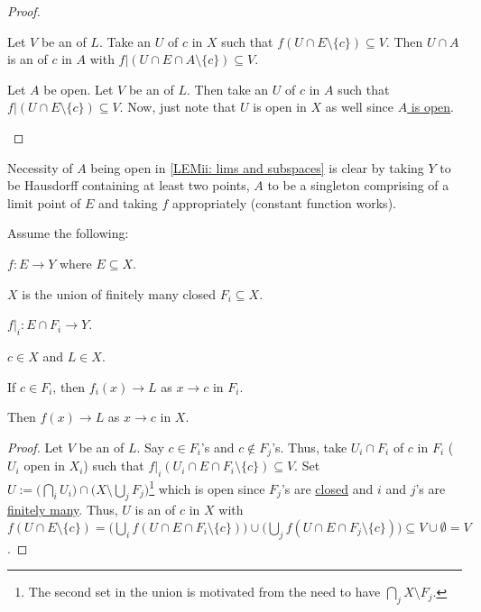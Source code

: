 	\begin{proof}
		\begin{mylist}
			\item Let $V$ be an \onbd of $L$. Take an \onbd $U$ of $c$ in $X$ such that $f(U\cap E\setminus\{c\})\subseteq V$. Then $U\cap A$ is an \onbd of $c$ in $A$ with $f|(U\cap E\cap A\setminus\{c\})\subseteq V$.
			
			\item Let $A$ be open. Let $V$ be an \onbd of $L$. Then take an \onbd $U$ of $c$ in $A$ such that $f|(U\cap E\setminus\{c\})\subseteq V$. Now, just note that $U$ is open in $X$ as well since \uline{$A$ is open}.
			\qedhere
		\end{mylist}
	\end{proof}
	
	\begin{rmk}
		Necessity of $A$ being open in \ref{LEMii: lims and subspaces} is clear by taking $Y$ to be Hausdorff containing at least two points, $A$ to be a singleton comprising of a limit point of $E$ and taking $f$ appropriately (constant function works).
	\end{rmk}
	
	
	\begin{prp}
		Assume the following:
		\begin{assmplist}
			\item $f\colon E\to Y$ where $E\subseteq X$.
			\item $X$ is the union of finitely many closed $F_i\subseteq X$.
			\item $f|_i : E\cap F_i\to Y$.
			\item $c\in X$ and $L\in X$.
			\item If $c\in F_i$, then $f_i(x)\to L$ as $x\to c$ in $F_i$.
		\end{assmplist}
		Then $f(x)\to L$ as $x\to c$ in $X$.
	\end{prp}
	
	\begin{proof}
		Let $V$ be an \onbd of $L$. Say $c\in F_i$'s and $c\notin F_j$'s. Thus, take  $U_i\cap F_i$ of $c$ in $F_i$ ($U_i$ open in $X_i$) such that $f|_i(U_i\cap E\cap F_i\setminus\{c\})\subseteq V$. Set $U := \bigl( \bigcap_i U_i \bigr)\cap \bigl(X\setminus \bigcup_j F_j\bigr)$\footnote{
			The second set in the union is motivated from the need to have $\bigcap_j X\setminus F_j$.
		} which is open since $F_j$'s are \uline{closed} and $i$ and $j$'s are \uline{finitely many}. Thus, $U$ is an \onbd of $c$ in $X$ with $f(U\cap E\setminus\{c\}) 
		= \bigl( \bigcup_i f(U\cap E\cap F_i\setminus\{c\}) \bigr)
			\cup \bigl( \bigcup_j f(U\cap E\cap F_j\setminus\{c\}) \bigr)
		\subseteq V\cup \emptyset = V$.
	\end{proof}
	
